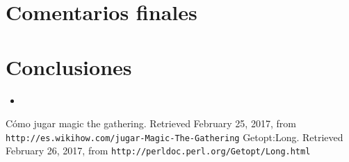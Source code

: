 \documentclass{IEEEtran}
\begin{document}
\section{Comentarios finales}

\section{Conclusiones}

\begin{itemize}
  \item 
\end{itemize}

\begin{thebibliography}{99}
  Cómo jugar magic the gathering. Retrieved February 25, 2017, from  \texttt{http://es.wikihow.com/jugar-Magic-The-Gathering}
  Getopt:Long. Retrieved February 26, 2017, from \texttt{http://perldoc.perl.org/Getopt/Long.html}
\end{thebibliography}
\end{document}
